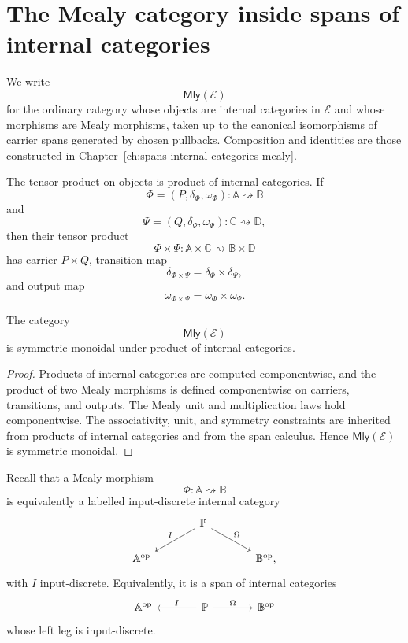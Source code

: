 \section{The Mealy category inside spans of internal categories}
\label{sec:mealy-category-inside-spans}

We write
\[
\mathsf{Mly}(\mathcal E)
\]
for the ordinary category whose objects are internal categories in
\(\mathcal E\) and whose morphisms are Mealy morphisms, taken up to the
canonical isomorphisms of carrier spans generated by chosen pullbacks.
Composition and identities are those constructed in
Chapter~\ref{ch:spans-internal-categories-mealy}.

The tensor product on objects is product of internal categories.  If
\[
\Phi=(P,\delta_\Phi,\omega_\Phi):
\mathbb A\rightsquigarrow\mathbb B
\]
and
\[
\Psi=(Q,\delta_\Psi,\omega_\Psi):
\mathbb C\rightsquigarrow\mathbb D,
\]
then their tensor product
\[
\Phi\times\Psi:
\mathbb A\times\mathbb C
\rightsquigarrow
\mathbb B\times\mathbb D
\]
has carrier \(P\times Q\), transition map
\[
\delta_{\Phi\times\Psi}
=
\delta_\Phi\times\delta_\Psi,
\]
and output map
\[
\omega_{\Phi\times\Psi}
=
\omega_\Phi\times\omega_\Psi.
\]

\begin{proposition}
\label{prop:mly-symmetric-monoidal}
The category
\[
\mathsf{Mly}(\mathcal E)
\]
is symmetric monoidal under product of internal categories.
\end{proposition}

\begin{proof}
Products of internal categories are computed componentwise, and the product of
two Mealy morphisms is defined componentwise on carriers, transitions, and
outputs.  The Mealy unit and multiplication laws hold componentwise.  The
associativity, unit, and symmetry constraints are inherited from products of
internal categories and from the span calculus.  Hence
\(\mathsf{Mly}(\mathcal E)\) is symmetric monoidal.
\end{proof}

Recall that a Mealy morphism
\[
\Phi:\mathbb A\rightsquigarrow\mathbb B
\]
is equivalently a labelled input-discrete internal category
\[
\begin{tikzcd}[column sep=large]
&
\mathbb P
  \arrow[dl, "I"']
  \arrow[dr, "\Omega"]
\\
\mathbb A^{\mathrm{op}}
&&
\mathbb B^{\mathrm{op}},
\end{tikzcd}
\]
with \(I\) input-discrete.  Equivalently, it is a span of internal categories
\[
\begin{tikzcd}[column sep=large]
\mathbb A^{\mathrm{op}}
&
\mathbb P
  \arrow[l, "I"']
  \arrow[r, "\Omega"]
&
\mathbb B^{\mathrm{op}}
\end{tikzcd}
\]
whose left leg is input-discrete.

